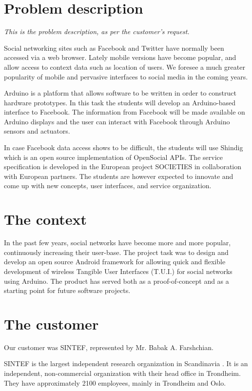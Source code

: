 \section{Problem description}

\emph{This is the problem description, as per the customer's request.}

Social networking sites such as Facebook\cite{link:facebook} and Twitter\cite{link:twitter}
have normally been accessed  via a web browser. Lately mobile versions have become popular,
and allow access to context data such as location of users. We foresee a much greater popularity
of mobile and pervasive interfaces to social media in the coming years.

Arduino\cite{link:arduino} is a platform that allows software to be written in order to construct
hardware prototypes. In this task the students will develop an Arduino-based interface to Facebook.
The information from Facebook will be made available on Arduino displays and the user can interact
with Facebook through Arduino sensors and actuators.

In case Facebook data access shows to be difficult, the students will use Shindig\cite{link:shinding} which 
is an open source implementation of OpenSocial\cite{link:opensocial} APIs. The service specification is developed
in the European project SOCIETIES in collaboration with European partners. The students are however expected to
innovate and come up with new concepts, user interfaces, and service organization.

\section{The context}
In the past few years, social networks have become more and more popular, continuously increasing their user-base.
The project task was to design and develop an open source Android\cite{link:android} framework for allowing quick
and flexible development of wireless Tangible User Interfaces (T.U.I.) for social networks using Arduino.
The product has served both as a proof-of-concept and as a starting point for future software projects.

\section{The customer}
Our customer was SINTEF, represented by Mr. Babak A. Farshchian.

SINTEF is the largest independent research organization in Scandinavia \cite{link:sintef}.
It is an independent, non-commercial organization with their head office in Trondheim.
They have approximately 2100 employees, mainly in Trondheim and Oslo.

